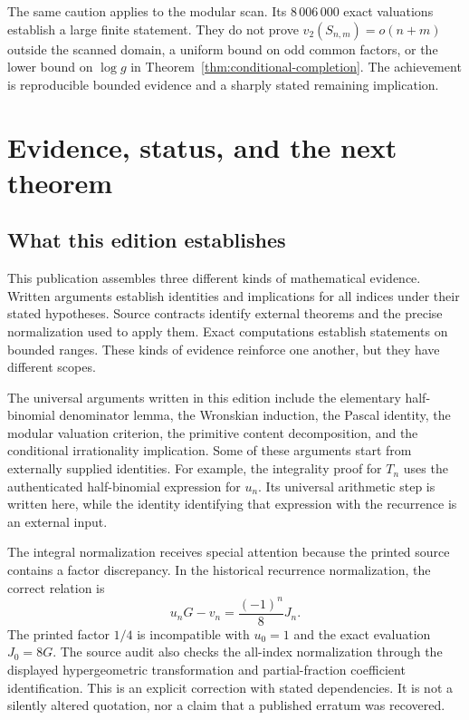 The same caution applies to the modular scan. Its $8\,006\,000$ exact valuations establish a large finite statement. They do not prove $v_2(S_{n,m})=o(n+m)$ outside the scanned domain, a uniform bound on odd common factors, or the lower bound on $\log g$ in Theorem~\ref{thm:conditional-completion}. The achievement is reproducible bounded evidence and a sharply stated remaining implication.

\chapter{Evidence, status, and the next theorem}
\label{chap:evidence-status}

\section{What this edition establishes}

This publication assembles three different kinds of mathematical evidence. Written arguments establish identities and implications for all indices under their stated hypotheses. Source contracts identify external theorems and the precise normalization used to apply them. Exact computations establish statements on bounded ranges. These kinds of evidence reinforce one another, but they have different scopes.

The universal arguments written in this edition include the elementary half-binomial denominator lemma, the Wronskian induction, the Pascal identity, the modular valuation criterion, the primitive content decomposition, and the conditional irrationality implication. Some of these arguments start from externally supplied identities. For example, the integrality proof for $T_n$ uses the authenticated half-binomial expression for $u_n$. Its universal arithmetic step is written here, while the identity identifying that expression with the recurrence is an external input.

The integral normalization receives special attention because the printed source contains a factor discrepancy. In the historical recurrence normalization, the correct relation is
\begin{equation}
 u_nG-v_n=\frac{(-1)^n}{8}J_n.
 \label{eq:status-normalization}
\end{equation}
The printed factor $1/4$ is incompatible with $u_0=1$ and the exact evaluation $J_0=8G$. The source audit also checks the all-index normalization through the displayed hypergeometric transformation and partial-fraction coefficient identification. This is an explicit correction with stated dependencies. It is not a silently altered quotation, nor a claim that a published erratum was recovered.

